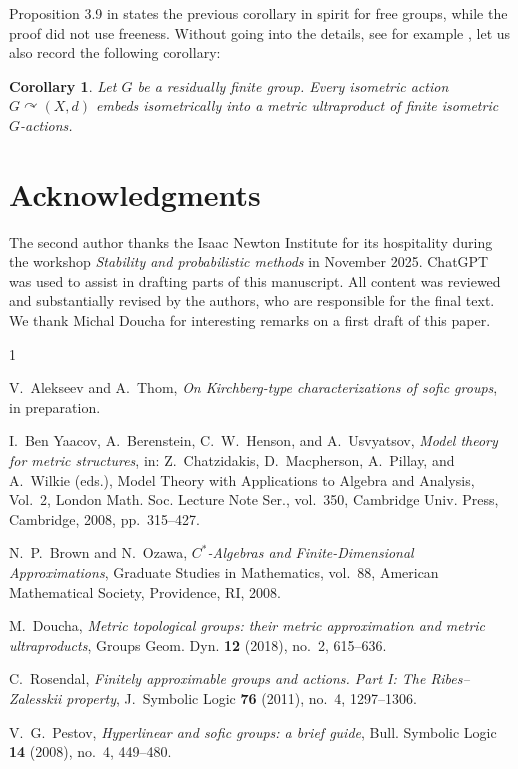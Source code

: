 \documentclass[11pt,a4paper]{amsproc}
\numberwithin{equation}{section}
\newtheorem{corollary}[theorem]{Corollary}
\theoremstyle{definition}
\begin{document}
Proposition 3.9 in \cite{DouchaMetricTopGroups} states the previous corollary in spirit for free groups, while the proof did not use freeness. Without going into the details, see for example \cite{BYBHU}, let us also record the following corollary:
\begin{corollary}
Let $G$ be a residually finite group. Every isometric action $G \curvearrowright (X,d)$ embeds isometrically into a metric ultraproduct of finite isometric $G$-actions.
\end{corollary}


\section*{Acknowledgments}

The second author thanks the Isaac Newton Institute for its hospitality during the workshop \emph{Stability and probabilistic methods} in November 2025. ChatGPT was used to assist in drafting parts of this manuscript. All content was reviewed and substantially revised by the authors, who are responsible for the final text. We thank Michal Doucha for interesting remarks on a first draft of this paper.

\begin{thebibliography}{1}

V.~Alekseev and A.~Thom,
\newblock \emph{On Kirchberg-type characterizations of sofic groups},
\newblock in preparation.

I.~Ben Yaacov, A.~Berenstein, C.~W.~Henson, and A.~Usvyatsov,
\newblock \emph{Model theory for metric structures},
\newblock in: Z.~Chatzidakis, D.~Macpherson, A.~Pillay, and A.~Wilkie (eds.),
Model Theory with Applications to Algebra and Analysis, Vol.~2,
London Math. Soc. Lecture Note Ser., vol.~350,
Cambridge Univ. Press, Cambridge, 2008, pp.~315--427.

N.~P.~Brown and N.~Ozawa,
\newblock \emph{$C^*$-Algebras and Finite-Dimensional Approximations},
\newblock Graduate Studies in Mathematics, vol.~88,
American Mathematical Society, Providence, RI, 2008.


M.~Doucha,
\newblock \emph{Metric topological groups: their metric approximation and metric ultraproducts},
\newblock Groups Geom. Dyn. \textbf{12} (2018), no.~2, 615--636.

C.~Rosendal,
\emph{Finitely approximable groups and actions. Part I:
The Ribes--Zalesskii property},
J.\ Symbolic Logic \textbf{76} (2011), no.~4, 1297--1306.

V.~G.~Pestov,
\newblock \emph{Hyperlinear and sofic groups: a brief guide},
\newblock Bull. Symbolic Logic \textbf{14} (2008), no.~4, 449--480.


\end{thebibliography}
\end{document}
